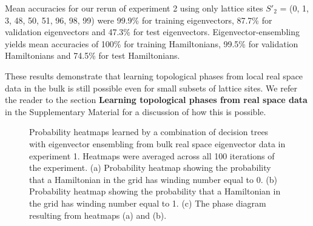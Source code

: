 \documentclass[fleqn,10pt]{wlscirep}
\begin{document}
Mean accuracies for our rerun of experiment 2 using only lattice sites $S'_2$ = (0, 1, 3, 48, 50, 51, 96, 98, 99) were 99.9\% for training eigenvectors, 87.7\% for validation eigenvectors and 47.3\% for test eigenvectors. Eigenvector-ensembling yields mean accuracies of 100\% for training Hamiltonians, 99.5\% for validation Hamiltonians and 74.5\% for test Hamiltonians.  

These results demonstrate that learning topological phases from local real space data in the bulk is still possible even for small subsets of lattice sites. We refer the reader to the section \textbf{Learning topological phases from real space data} in the Supplementary Material for a discussion of how this is possible.

\begin{figure}
\centering
{}
\caption{Probability heatmaps learned by a combination of decision trees with eigenvector ensembling from bulk real space eigenvector data in experiment 1. Heatmaps were averaged across all 100 iterations of the experiment. (a) Probability heatmap showing the probability that a Hamiltonian in the grid has winding number equal to 0.  (b) Probability heatmap showing the probability that a Hamiltonian in the grid has winding number equal to 1. (c) The phase diagram resulting from heatmaps (a) and (b).}
\label{ssh1_heatmaps}
\end{figure}
\end{document}
